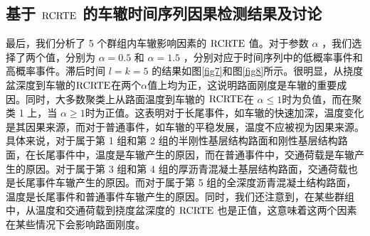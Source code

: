 \subsection{基于 $\rm{RCRTE}$ 的车辙时间序列因果检测结果及讨论}
最后，我们分析了 5 个群组内车辙影响因素的 $\rm{RCRTE}$ 值。对于参数 $\alpha$ ，我们选择了两个值，分别为 $\alpha=0.5$ 和 $\alpha=1.5$ ，分别对应于时间序列中的低概率事件和高概率事件。滞后时间 $l=k=5$ 的结果如图\ref{fig7}和图\ref{fig8}所示。很明显，从挠度盆深度到车辙的$\rm{RCRTE}$在两个$\alpha$值上均为正，这说明路面刚度是车辙的重要成因。同时，大多数聚类上从路面温度到车辙的 $\rm{RCRTE}$在 $\alpha\le1$时为负值，而在聚类 1 上，当 $\alpha \ge 1$时为正值。这表明对于长尾事件，如车辙的快速加深，温度变化是其因果来源，而对于普通事件，如车辙的平稳发展，温度不应被视为因果来源。具体来说，对于属于第 1 组和第 2 组的半刚性基层结构路面和刚性基层结构路面，在长尾事件中，温度是车辙产生的原因，而在普通事件中，交通荷载是车辙产生的原因。对于属于第 3 组和第 4 组的厚沥青混凝土基层结构路面，交通荷载也是长尾事件车辙产生的原因。而对于属于第 5 组的全深度沥青混凝土结构路面，温度是长尾事件和普通事件车辙产生的原因。同时，我们还注意到，在某些群组中，从温度和交通荷载到挠度盆深度的 $\rm{RCRTE}$ 也是正值，这意味着这两个因素在某些情况下会影响路面刚度。
